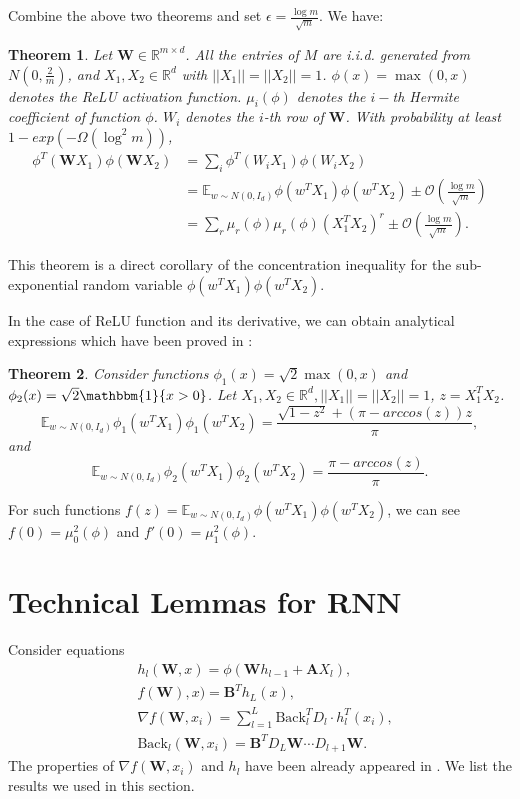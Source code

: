 \documentclass{article}
\newcommand{\cO}{\mathcal{O}}
\newtheorem{theo}{\textbf{Theorem}}
\begin{document}
Combine the above two theorems and set $\epsilon=\frac{\log m}{\sqrt{m}}$. We have:
\begin{theo}\label{fj}
Let $\bm{W}\in \mathbb{R}^{m\times d}$. All  the entries of $M$ are i.i.d. generated from $N(0,\frac{2}{m})$, and $X_1,X_2\in\mathbb{R}^d$ with $||X_1||=||X_2||=1$. $\phi(x)=\max(0,x)$ denotes the ReLU activation function. $\mu_i(\phi)$ denotes the $i-$th Hermite coefficient of function $\phi$. $W_i$ denotes the $i$-th row of $\bm{W}$.
With probability at least $1-exp(-\Omega(\log^2m ))$,
\begin{equation}
\begin{aligned}
\phi^T(\bm{W}X_1)\phi(\bm{W}X_2)&=\sum_i \phi^T(W_iX_1)\phi(W_iX_2)\\
&=\mathbb{E}_{w\sim N(0, I_d)}\phi(w^TX_1)\phi(w^TX_2)\pm \cO(\frac{\log m}{\sqrt{m}})\\
&=\sum_r \mu_r(\phi)\mu_r(\phi)(X_1^TX_2)^{r} \pm \cO(\frac{\log m}{\sqrt{m}}).
\end{aligned}
\end{equation}
\end{theo}
This theorem is a direct corollary of the concentration inequality for the sub-exponential random variable $\phi(w^TX_1)\phi(w^TX_2)$.

In the case of ReLU function and its derivative, we can obtain analytical expressions which have been proved in \cite{NIPS2016_abea47ba,huang2020deep}:
\begin{theo}\label{fj2}
Consider functions $\phi_1(x)=\sqrt{2}\max(0,x)$ and $\phi_2(x)=\sqrt{2}\mathbbm{1}\{x>0\}$. Let $X_1, X_2\in \mathbb{R}^d, ||X_1||= ||X_2||=1$, $z=X_1^TX_2$.
\begin{equation}
\mathbb{E}_{w\sim N(0, I_d)}\phi_1(w^TX_1)\phi_1(w^TX_2)=\frac{\sqrt{1-z^2}+(\pi-arccos(z))z}{\pi},
\end{equation}
and
\begin{equation}
\mathbb{E}_{w\sim N(0, I_d)}\phi_2(w^TX_1)\phi_2(w^TX_2)=\frac{\pi-arccos(z)}{\pi}.
\end{equation}
\end{theo}
For such functions $f(z)=\mathbb{E}_{w\sim N(0, I_d)}\phi(w^TX_1)\phi(w^TX_2)$, we can see $f(0)=\mu^2_0(\phi)$ and $f'(0)=\mu^2_1(\phi)$.

\section{Technical Lemmas for RNN}
Consider equations
\begin{equation}
\begin{aligned}
&h_{l}(\bm{W},x)=\phi(\bm{W}h_{l-1}+\bm{A}X_l),\\
&f(\bm{W}),x)=\bm{B}^Th_L(x),\\
&\nabla f(\bm{W},x_i)=\sum_{l=1}^L\text{Back}^T_lD_l\cdot h_l^T(x_i),\\
&\text{Back}_l(\bm{W},x_i)=\bm{B}^TD_L\bm{W}\cdots D_{l+1}\bm{W}.
\end{aligned}
\end{equation}
The properties of $\nabla f(\bm{W},x_i)$ and $h_l$ have been already appeared in \cite{rate}. We list the results we used in this section.
\end{document}
